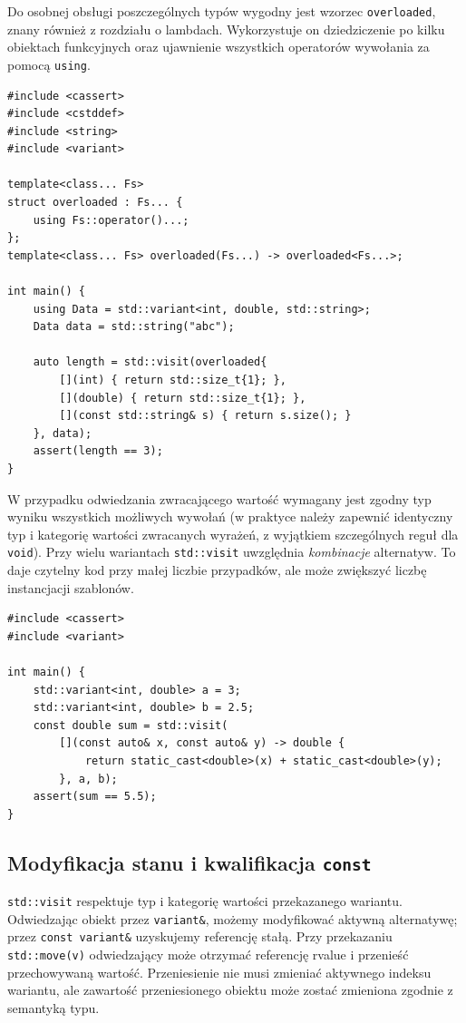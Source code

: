 Do osobnej obsługi poszczególnych typów wygodny jest wzorzec
\texttt{overloaded}, znany również z rozdziału o lambdach.
Wykorzystuje on dziedziczenie po kilku obiektach funkcyjnych oraz
ujawnienie wszystkich operatorów wywołania za pomocą \texttt{using}.

\begin{lstlisting}[caption={overloaded oraz std::visit (C++17); kompletny program.}]
#include <cassert>
#include <cstddef>
#include <string>
#include <variant>

template<class... Fs>
struct overloaded : Fs... {
    using Fs::operator()...;
};
template<class... Fs> overloaded(Fs...) -> overloaded<Fs...>;

int main() {
    using Data = std::variant<int, double, std::string>;
    Data data = std::string("abc");

    auto length = std::visit(overloaded{
        [](int) { return std::size_t{1}; },
        [](double) { return std::size_t{1}; },
        [](const std::string& s) { return s.size(); }
    }, data);
    assert(length == 3);
}
\end{lstlisting}

W przypadku odwiedzania zwracającego wartość wymagany jest zgodny typ
wyniku wszystkich możliwych wywołań (w praktyce należy zapewnić
identyczny typ i kategorię wartości zwracanych wyrażeń, z wyjątkiem
szczególnych reguł dla \texttt{void}). Przy wielu wariantach
\texttt{std::visit} uwzględnia \emph{kombinacje} alternatyw. To daje
czytelny kod przy małej liczbie przypadków, ale może zwiększyć liczbę
instancjacji szablonów.

\begin{lstlisting}[caption={Odwiedzenie dwóch wariantów naraz; kompletny program.}]
#include <cassert>
#include <variant>

int main() {
    std::variant<int, double> a = 3;
    std::variant<int, double> b = 2.5;
    const double sum = std::visit(
        [](const auto& x, const auto& y) -> double {
            return static_cast<double>(x) + static_cast<double>(y);
        }, a, b);
    assert(sum == 5.5);
}
\end{lstlisting}

\subsection{Modyfikacja stanu i kwalifikacja \texttt{const}}

\texttt{std::visit} respektuje typ i kategorię wartości przekazanego
wariantu. Odwiedzając obiekt przez \texttt{variant\&}, możemy modyfikować
aktywną alternatywę; przez \texttt{const variant\&} uzyskujemy
referencję stałą. Przy przekazaniu \texttt{std::move(v)} odwiedzający
może otrzymać referencję rvalue i przenieść przechowywaną wartość.
Przeniesienie nie musi zmieniać aktywnego indeksu wariantu, ale zawartość
przeniesionego obiektu może zostać zmieniona zgodnie z semantyką typu.

